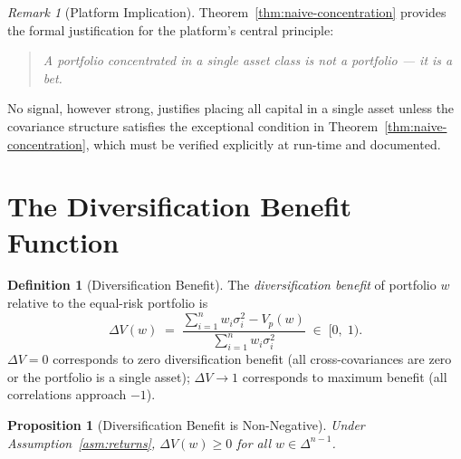 \documentclass[12pt,openany]{book}
\newcommand{\bfw}{\mathbf{w}}
\numberwithin{equation}{chapter}
\theoremstyle{plain}
\newtheorem{proposition}[theorem]{Proposition}
\theoremstyle{definition}
\newtheorem{definition}[theorem]{Definition}
\theoremstyle{remark}
\newtheorem{remark}[theorem]{Remark}
\def\bfw{w}%
\begin{document}
\begin{remark}[Platform Implication]
Theorem~\ref{thm:naive-concentration} provides the formal justification
for the platform's central principle:
\begin{quote}
\emph{A portfolio concentrated in a single asset class is not a portfolio
--- it is a bet.}
\end{quote}
No signal, however strong, justifies placing all capital in a single
asset unless the covariance structure satisfies the exceptional condition
in Theorem~\ref{thm:naive-concentration}, which must be verified
explicitly at run-time and documented.
\end{remark}

\section{The Diversification Benefit Function}

\begin{definition}[Diversification Benefit]
\label{def:div-benefit}
The \emph{diversification benefit} of portfolio $\bfw$ relative to
the equal-risk portfolio is
\begin{equation}
  \Delta V(\bfw)
  \;=\;
  \frac{\displaystyle\sum_{i=1}^n w_i \sigma_i^2
        - V_p(\bfw)}
       {\displaystyle\sum_{i=1}^n w_i \sigma_i^2}
  \;\in\; [0,\; 1).
  \label{eq:div-benefit}
\end{equation}
$\Delta V = 0$ corresponds to zero diversification benefit
(all cross-covariances are zero or the portfolio is a single asset);
$\Delta V \to 1$ corresponds to maximum benefit (all correlations
approach $-1$).
\end{definition}

\begin{proposition}[Diversification Benefit is Non-Negative]
\label{prop:div-benefit-nonneg}
Under Assumption~\ref{asm:returns}, $\Delta V(\bfw) \geq 0$
for all $\bfw \in \Delta^{n-1}$.
\end{proposition}
\end{document}
